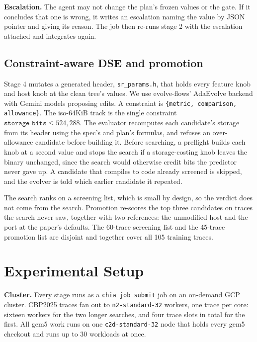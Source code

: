 \documentclass[conference]{IEEEtran}
\begin{document}
\textbf{Escalation.} The agent may not change the plan's frozen values or the
gate. If it concludes that one is wrong, it writes an escalation naming the
value by JSON pointer and giving its reason. The job then re-runs stage 2 with
the escalation attached and integrates again.

\subsection{Constraint-aware DSE and promotion}

Stage 4 mutates a generated header, \texttt{sr\_params.h}, that holds every
feature knob and host knob at the clean tree's values. We use evolve-flows'
AdaEvolve backend with Gemini models proposing edits. A constraint is
\texttt{\{metric, comparison, allowance\}}. The iso-64KiB track is the single
constraint $\texttt{storage\_bits} \le 524{,}288$. The evaluator recomputes each
candidate's storage from its header using the spec's and plan's formulas, and
refuses an over-allowance candidate before building it. Before searching, a
preflight builds each knob at a second value and stops the search if a
storage-costing knob leaves the binary unchanged, since the search would
otherwise credit bits the predictor never gave up. A candidate that compiles to
code already screened is skipped, and the evolver is told which earlier
candidate it repeated.

The search ranks on a screening list, which is small by design, so the verdict
does not come from the search. Promotion re-scores the top three candidates on
traces the search never saw, together with two references: the unmodified host
and the port at the paper's defaults. The 60-trace screening list and the
45-trace promotion list are disjoint and together cover all 105 training
traces.

\section{Experimental Setup}\label{sec:setup}

\textbf{Cluster.} Every stage runs as a \texttt{chia job submit} job on an
on-demand GCP cluster. CBP2025 traces fan out to \texttt{n2-standard-32}
workers, one trace per core: sixteen workers for the two longer searches, and
four trace slots in total for the first. All gem5 work runs on one
\texttt{c2d-standard-32} node that holds every gem5 checkout and runs up to 30
workloads at once.
\end{document}
